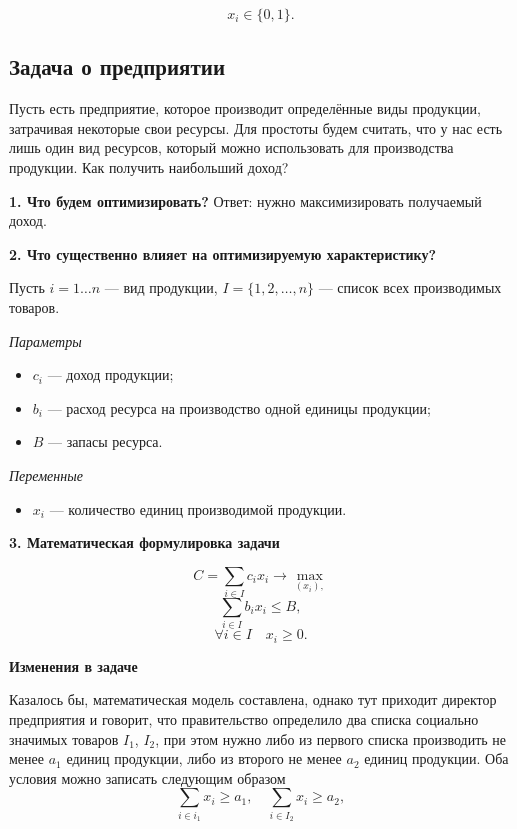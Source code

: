 \[
x_i \in \{0, 1\}.
\]

\subsection{Задача о предприятии}

Пусть есть предприятие, которое производит определённые виды продукции, затрачивая некоторые свои ресурсы. Для простоты будем считать, что у нас есть лишь один вид ресурсов, который можно использовать для производства продукции. Как получить наибольший доход?

\bigskip

\textbf{1. Что будем оптимизировать?} Ответ: нужно максимизировать получаемый доход.

\bigskip

\textbf{2. Что существенно влияет на оптимизируемую характеристику?}

Пусть $i = 1 \dots n$ --- вид продукции, $I = \{1, 2, \dots, n\}$ --- список всех производимых товаров.

\bigskip

\textit{Параметры}

\begin{itemize}[nosep]
	\item $c_i$ --- доход продукции;
		
	\item $b_i$ --- расход ресурса на производство одной единицы продукции;
	
	\item $B$ --- запасы ресурса.
\end{itemize}

\bigskip

\textit{Переменные}
\begin{itemize}[nosep]
	\item $x_i$ --- количество единиц производимой продукции.
\end{itemize}

\bigskip

\textbf{3. Математическая формулировка задачи}

\[
C = \sum_{i \in I}c_i x_i \to \max_{(x_i),}
\]
\[
\sum_{i \in I}b_i x_i \le B,
\]
\[
\forall i \in I \quad x_i \ge 0.
\]

\textbf{Изменения в задаче}

Казалось бы, математическая модель составлена, однако тут приходит директор предприятия и говорит, что правительство определило два списка социально значимых товаров $I_1$, $I_2$, при этом нужно либо из первого списка производить не менее $a_1$ единиц продукции, либо из второго не менее $a_2$ единиц продукции. Оба условия можно записать следующим образом
\[
\sum_{i \in i_1} x_i \ge a_1, \quad \sum_{i \in I_2} x_i \ge a_2,
\]

